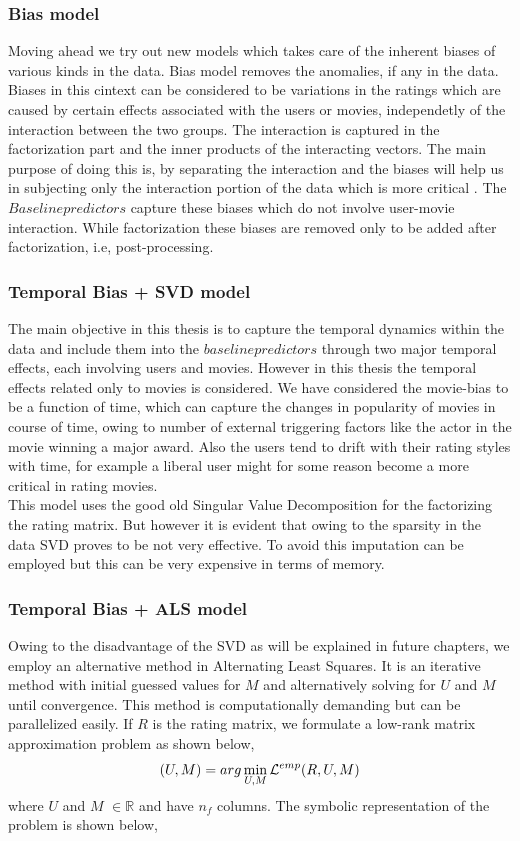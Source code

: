 \subsubsection{Bias model} Moving ahead we try out new models which takes care
of the inherent biases of various kinds in the data. Bias model removes the
anomalies, if any in the data. Biases in this cintext can be considered to be
variations in the ratings which are caused by certain effects associated with
the users or movies, independetly of the interaction between the two groups.
The interaction is captured in the factorization part and the inner products of
the interacting vectors. The main purpose of doing this is, by separating the
interaction and the biases will help us in subjecting only the interaction
portion of the data which is more critical
\cite{Koren:2010:CFT:1721654.1721677}.
The $Baseline predictors$ capture these biases which do not involve user-movie
interaction. While factorization these biases are removed only to be added after
factorization, i.e, post-processing. 
\subsubsection{Temporal Bias + SVD model} The main objective in this thesis is
to capture the temporal dynamics within the data and include them into the
$baseline predictors$ through two major temporal effects, each involving users
and movies. However in this thesis the temporal effects related only to movies
is considered. We have considered the movie-bias to be a function of time, which
can capture the changes in popularity of movies in course of time, owing to
number of external triggering factors like the actor in the movie winning a
major award. Also the users tend to drift with their rating styles with time,
for example a liberal user might for some reason become a more critical in
rating movies. \\
 This model uses the good old Singular Value Decomposition for the factorizing
the rating matrix. But however it is evident that owing to the sparsity in the
data SVD proves to be not very effective. To avoid this imputation can be
employed but this can be very expensive in terms of memory. 
\subsubsection{Temporal Bias + ALS model} Owing to the disadvantage of the SVD
as will be explained in future chapters, we employ an alternative method in
Alternating Least Squares. It is an iterative method with initial guessed
values for $M$ and alternatively solving for $U$ and $M$ until convergence. This
method is computationally demanding but can be parallelized easily. If $R$ is
the rating matrix, we formulate a low-rank matrix approximation problem as shown
below,
\begin{equation}
 (U,M)=arg \min_{U,M} \mathcal{L}^{\emph{emp}}(R,U,M)
\end{equation}
where $U$ and $M$ $\in \mathbb{R}$ and have $n_f$ columns. The symbolic
representation of the problem is shown below,


